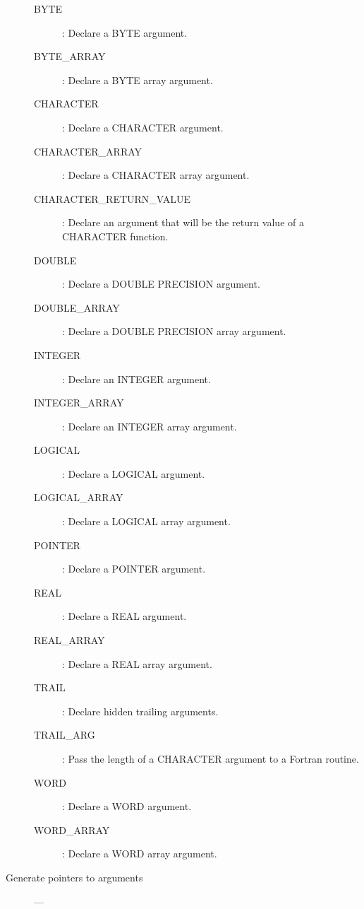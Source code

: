 \begin{description}
\begin{description}
\item [BYTE] : Declare a BYTE argument.
\item [BYTE\_ARRAY] : Declare a BYTE array argument.
\item [CHARACTER] : Declare a CHARACTER argument.
\item [CHARACTER\_ARRAY] : Declare a CHARACTER array argument.
\item [CHARACTER\_RETURN\_VALUE] : Declare an argument that will be the return value of a CHARACTER function.
\item [DOUBLE] : Declare a DOUBLE PRECISION argument.
\item [DOUBLE\_ARRAY] : Declare a DOUBLE PRECISION array argument.
\item [INTEGER] : Declare an INTEGER argument.
\item [INTEGER\_ARRAY] : Declare an INTEGER array argument.
\item [LOGICAL] : Declare a LOGICAL argument.
\item [LOGICAL\_ARRAY] : Declare a LOGICAL array argument.
\item [POINTER] : Declare a POINTER argument.
\item [REAL] : Declare a REAL argument.
\item [REAL\_ARRAY] : Declare a REAL array argument.
\item [TRAIL] : Declare hidden trailing arguments.
\item [TRAIL\_ARG] : Pass the length of a CHARACTER argument to a Fortran routine.
\item [WORD] : Declare a WORD argument.
\item [WORD\_ARRAY] : Declare a WORD array argument.
\end{description}

\item [Generate pointers to arguments] ---


\end{description}
